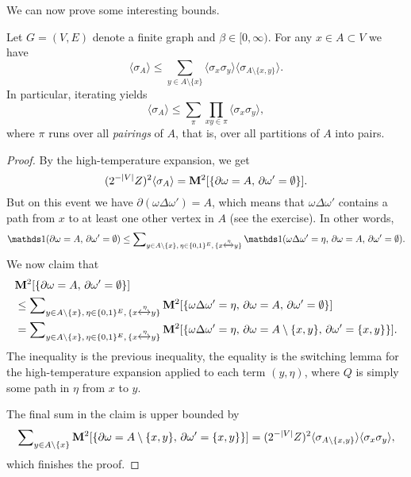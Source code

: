 We can now prove some interesting bounds.

\begin{theorem}
    Let $G=(V,E)$ denote a finite graph and $\beta\in[0,\infty)$.
    For any $x\in A\subset V$ we have
    \begin{equation}
        \langle\sigma_A\rangle
        \leq
        \sum_{y\in A\setminus\{x\}}
        \langle\sigma_x\sigma_y\rangle
        \langle \sigma_{A\setminus\{x,y\}}\rangle.
    \end{equation}
    In particular, iterating yields
    \[
        \langle\sigma_A\rangle
        \leq
        \sum_{\pi}
        \prod_{xy\in\pi}
        \langle\sigma_x\sigma_y\rangle,
    \]
    where $\pi$ runs over all \emph{pairings} of $A$,
    that is, over all partitions of $A$ into pairs.
\end{theorem}

\begin{proof}
    By the high-temperature expansion,
    we get
    \[
        (2^{-|V|}Z)^2 \langle\sigma_A\rangle
        =
        \mathbf{M}^2[\{\partial\omega = A,\,\partial\omega'=\emptyset\}].
    \]
    But on this event we have $\partial(\omega\Delta\omega')=A$,
    which means that $\omega\Delta\omega'$ contains a path
    from $x$ to at least one other vertex in $A$ (see the exercise).
    In other words,
    \[
        \true{\partial\omega = A,\,\partial\omega'=\emptyset}
        \leq
        \sum\nolimits_{y\in A\setminus\{x\},\,\eta\in\{0,1\}^E,\,\{x\xleftrightarrow{\eta}y\}}
        \true{\omega\Delta\omega'=\eta,\,\partial\omega = A,\,\partial\omega'=\emptyset}.
    \]
    We now claim that
    \begin{align}
        &\mathbf{M}^2[\{\partial\omega = A,\,\partial\omega'=\emptyset\}]
        \\&\leq 
            \sum\nolimits_{y\in A\setminus\{x\},\,\eta\in\{0,1\}^E,\,\{x\xleftrightarrow{\eta}y\}}
        \mathbf{M}^2[
        \{\omega\Delta\omega'=\eta,\,\partial\omega = A,\,\partial\omega'=\emptyset\}
        ]
        \\&=
            \sum\nolimits_{y\in A\setminus\{x\},\,\eta\in\{0,1\}^E,\,\{x\xleftrightarrow{\eta}y\}}
        \mathbf{M}^2[
        \{\omega\Delta\omega'=\eta,\,\partial\omega = A\setminus\{x,y\},\,\partial\omega'=\{x,y\}\}
        ].
    \end{align}
    The inequality is the previous inequality,
    the equality is the switching lemma for the high-temperature expansion
    applied to each term $(y,\eta)$,
    where $Q$ is simply some path in $\eta$ from $x$ to $y$.

    The final sum in the claim is upper bounded by
    \[
        \sum\nolimits_{y\in A\setminus\{x\}}
        \mathbf{M}^2[
        \{\partial\omega = A\setminus\{x,y\},\,\partial\omega'=\{x,y\}\}
        ]
        =
        (2^{-|V|}Z)^2 \langle\sigma_{A\setminus\{x,y\}}\rangle\langle\sigma_x\sigma_y\rangle,
    \]
    which finishes the proof.
\end{proof}

